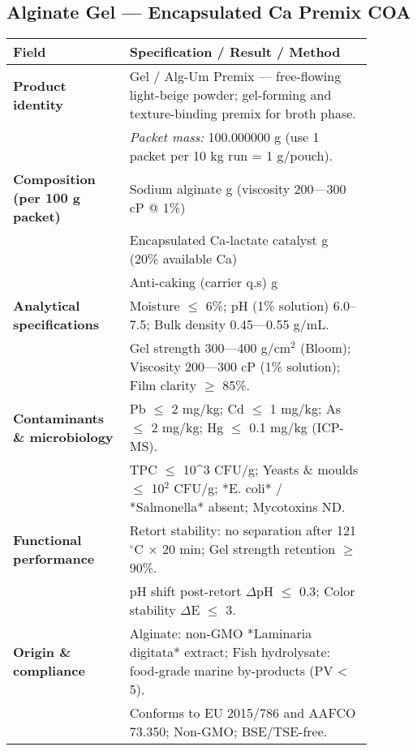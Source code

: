 \subsection*{Alginate Gel --- Encapsulated Ca Premix COA}
\begin{adjustbox}{max width=\textwidth}\begin{tabular}{@{}p{0.28\linewidth}p{0.60\linewidth}@{}}
\toprule
\textbf{Field} & \textbf{Specification / Result / Method} \\
\midrule

\textbf{Product identity} &
Gel / Alg-Um Premix --- free-flowing light-beige powder; gel-forming and texture-binding premix for broth phase. \\
& \textit{Packet mass:} 100.000000 g (use 1 packet per 10 kg run = 1 g/pouch). \\

\midrule
\textbf{Composition (per 100 g packet)} &
Sodium alginate \dotfill 60.000000 g (viscosity 200---300 cP @ 1\%) \\
& Encapsulated Ca-lactate catalyst \dotfill 39.500000 g (20\% available Ca) \\
& Anti-caking (carrier q.s) \dotfill 0.500000 g  \\

\midrule
\textbf{Analytical specifications} &
Moisture $\leq$ 6\%; pH (1\% solution) 6.0--7.5; Bulk density 0.45---0.55 g/mL. \\
& Gel strength 300---400 g/cm$^2$ (Bloom); Viscosity 200---300 cP (1\% solution); Film clarity $\geq$ 85\%. \\

\midrule
\textbf{Contaminants \& microbiology} &
Pb $\leq$ 2 mg/kg; Cd $\leq$ 1 mg/kg; As $\leq$ 2 mg/kg; Hg $\leq$ 0.1 mg/kg (ICP-MS). \\
& TPC $\leq$ 10^3 CFU/g; Yeasts \& moulds $\leq$ 10$^2$ CFU/g; *E. coli* / *Salmonella* absent; Mycotoxins ND. \\

\midrule
\textbf{Functional performance} &
Retort stability: no separation after 121 $^\circ$C $\times$ 20 min; Gel strength retention $\geq$ 90\%. \\
& pH shift post-retort $\Delta$pH $\leq$ 0.3; Color stability $\Delta$E $\leq$ 3. \\

\midrule
\textbf{Origin \& compliance} &
Alginate: non-GMO *Laminaria digitata* extract; Fish hydrolysate: food-grade marine by-products (PV < 5). \\
& Conforms to EU 2015/786 and AAFCO 73.350; Non-GMO; BSE/TSE-free. \\


\end{tabular}
\end{adjustbox}
